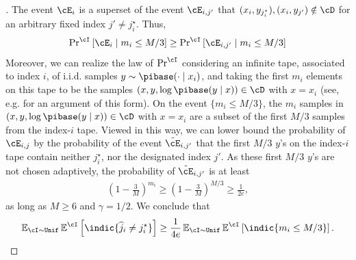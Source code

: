 \begin{proof}[]
   The event $\cE_i$ is a superset of the event $\cE_{i,j'}$ that
  $(x_i,y_{j^{\star}_i}),(x_i,y_{j'}) \notin \cD$ for an arbitrary
  fixed index $j' \ne j^{\star}_i$. 
  Thus,
  \begin{align}
      \Pnki \left[\cE_i \mid m_i \le M/3\right] \ge \Pnki \left[ \cE_{i,j'} \mid m_i \le M/3\right] 
  \end{align}
  Moreover, we can realize the law of $\Pnki$ considering an infinite tape, associated to index $i$, of i.i.d. samples $y \sim \pibase(\cdot \mid x_i)$, and taking the first $m_i$ elements on this tape to be the samples 
  $(x,y,\log \pibase(y \mid x)) \in \cD$ with $x = x_i$  (see, e.g. \citet{simchowitz2017simulator} for an argument of this form).  On the event $\{m_i \le M/3\}$, the $m_i$ samples in $(x,y,\log \pibase(y \mid x)) \in \cD$ with $x = x_i$ are a subset of the first $M/3$ samples from the index-$i$ tape. Viewed in this way, we can lower bound the probability of $\cE_{i,j}$ by the probability of the event $\tilde \cE_{i,j'}$ that the first $M/3$ $y$'s on the index-$i$ tape contain neither $j^\star_i$, nor the designated index $j'$. As these first $M/3$ $y$'s are not chosen adaptively, the probability of $\tilde \cE_{i,j'}$ is at least
  \begin{align}
    \left(1 - \frac{3}{M}\right)^{m_i} \ge \left(1 - \frac{3}{M}\right)^{M/3}\geq\frac{1}{2e},
  \end{align}
  as long as $M\geq{}6$ and $\gamma=1/2$. We conclude
  that
  \begin{align}
    \EnI\Enki\left[ \indic\{\wh{j}_i \ne j_i^\star\}\right]
    \geq{} \frac{1}{4e}    \EnI\Enki\left[ \indic\{m_i\leq{}M/3\}\right].
  \end{align}  
\end{proof}



  

